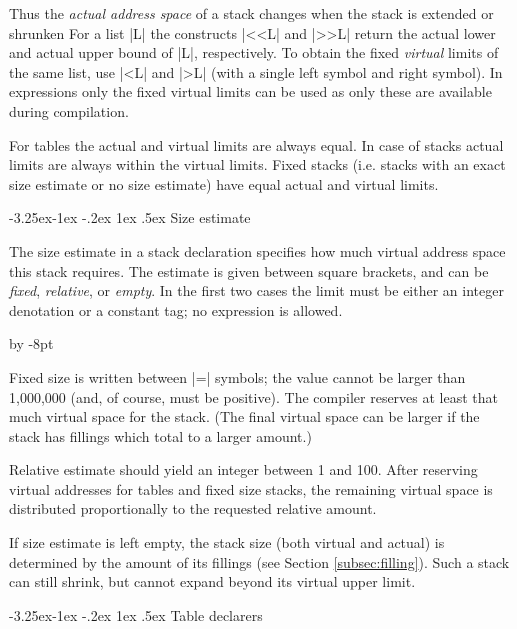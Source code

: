 \documentclass{article}
\makeatletter
\newcommand\g[1]{\textsf{#1}}
\renewenvironment{itemize}{\begin{list}{}{%
\advance\leftmargin by -8pt%
\setlength\itemsep{0ex plus 0.2ex}%
\setlength\partopsep{3pt}%
\setlength\topsep{2pt plus 2pt}%
\setlength\parsep{0pt plus 2pt}%
}}{\end{list}}
\renewcommand\subsection{%
\@startsection{subsection}{2}{\z@}%
   {-3.25ex\@plus -1ex \@minus -.2ex}%
   {1ex \@plus .5ex}%
   {\normalfont\normalsize\bfseries}}
\makeatother
\begin{document}
Thus the \emph{actual address space} of a \g{stack} changes when the stack
is extended or shrunken For a list \pp|L| the constructs \pp|<<L| and
\pp|>>L| return the actual lower and actual upper bound of \pp|L|,
respectively. To obtain the fixed \emph{virtual} limits of the same list,
use \pp|<L| and \pp|>L| (with a single \g{left symbol} and \g{right
symbol}). In expressions only the fixed virtual limits can be used as only
these are available during compilation.

For \g{table}s the actual and virtual limits are always equal. In case of
\g{stack}s actual limits are always within the virtual limits. Fixed stacks
(i.e. stacks with an exact size estimate or no size estimate) have
equal actual and virtual limits.


\subsection{Size estimate}\label{subsec:size-estimate}

The \g{size estimate} in a \g{stack declaration} specifies how much 
virtual address space this stack requires. The estimate is given between
square brackets, and can be \emph{fixed}, \emph{relative}, or
\emph{empty}. In the first two cases the limit must be either an integer
denotation or a constant tag; no expression is allowed.
\begin{itemize}
\item[$\bullet$] Fixed size is written between \pp|=| symbols; the value
cannot be larger than 1,000,000 (and, of course, must be positive). The
compiler reserves at least that much virtual space for the stack. (The final
virtual space can be larger if the stack has fillings which total to a
larger amount.)

\item[$\bullet$] Relative estimate should yield an integer between 1 and 100.
After reserving virtual addresses for \g{table}s and fixed size \g{stack}s,
the remaining virtual space is distributed proportionally to the requested
relative amount.

\item[$\bullet$] If size estimate is left empty, the stack size (both
virtual and actual) is determined by the amount of its fillings (see Section
\ref{subsec:filling}). Such a stack can still shrink, but cannot expand
beyond its virtual upper limit.

\end{itemize}

\subsection{Table declarers}
\end{document}
